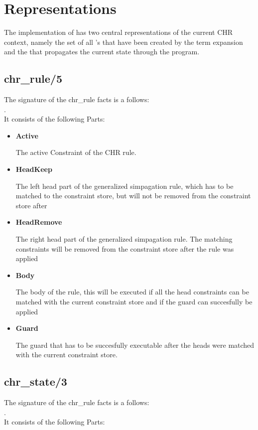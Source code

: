 \section{Representations}

The implementation of {\dhr} has two central representations of the current CHR context, namely the set of all 's that have been created by the term expansion and the  that propagates the current state through the program.

\subsection{chr_rule/5}
The signature of the chr_rule facts is a follows:\\
.\\
It consists of the following Parts:

\begin{itemize}
\item \textbf{Active}

The active Constraint of the CHR rule.
\item \textbf{HeadKeep}

The left head part of the generalized simpagation rule, which has to be matched to the constraint store, but will not be removed from the constraint store after
\item \textbf{HeadRemove}

The right head part of the generalized simpagation rule. The matching constraints will be removed from the constraint store after the rule was applied
\item \textbf{Body}

The body of the rule, this will be executed if all the head constraints can be matched with the current constraint store and if the guard can succesfully be applied
\item \textbf{Guard}

The guard that has to be succesfully executable after the heads were matched with the current constraint store.
\end{itemize}

\subsection{chr_state/3}
The signature of the chr_rule facts is a follows:\\
.\\
It consists of the following Parts:

